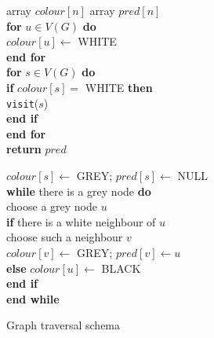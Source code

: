 \begin{figure}[htbp]
\label{fig:travcode}

{
array $colour[n]$ array $pred[n]$ \\

\textbf{for} $u \in V(G)$ \textbf{do} \\

\> $colour[u] \gets $ WHITE \\

\textbf{end for}\\

\textbf{for}  $s\in V(G)$ \textbf{do} \\

\> \textbf{if} $colour[s] = $ WHITE \textbf{then} \\

\> \> \texttt{visit}($s$) \\

\> \textbf{end if}\\

\textbf{end for}\\

\textbf{return} $pred$ \\
}


{

$colour[s] \gets $ GREY; $pred[s] \gets $ NULL \\

\textbf{while} there is a grey node \textbf{do} \\

\> choose a grey node $u$ \\

\> \textbf{if} there is a white neighbour of $u$  \\

\> \> choose such a neighbour $v$ \\

\> \> $colour[v] \gets $ GREY; $pred[v] \gets u$ \\

\> \textbf{else} $colour[u] \gets $ BLACK \\

\> \textbf{end if} \\

\textbf{end while}\\
}

\caption{Graph traversal schema}

\end{figure}


